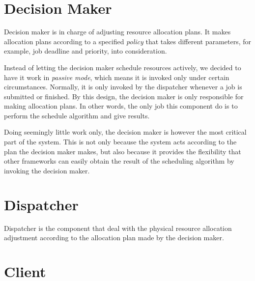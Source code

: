 \section{Decision Maker}

Decision maker is in charge of adjusting resource allocation plans.  It
makes allocation plans according to a specified \emph{policy} that takes
different parameters, for example, job deadline and priority, into
consideration. 

Instead of letting the decision maker schedule resources actively, we
decided to have it work in \emph{passive mode}, which means it is
invoked only under certain circumstances.  Normally, it is only invoked
by the dispatcher whenever a job is submitted or finished.  By this
design, the decision maker is only responsible for making allocation
plans.  In other words, the only job this component do is to perform the
schedule algorithm and give results.  

Doing seemingly little work only, the decision maker is however the most
critical part of the system. This is not only because the system acts
according to the plan the decision maker makes, but also because it
provides the flexibility that other frameworks can easily obtain the
result of the scheduling algorithm by invoking the decision maker.

\section{Dispatcher}

Dispatcher is the component that deal with the physical resource
allocation adjustment according to the allocation plan made by the
decision maker.

\section{Client}
